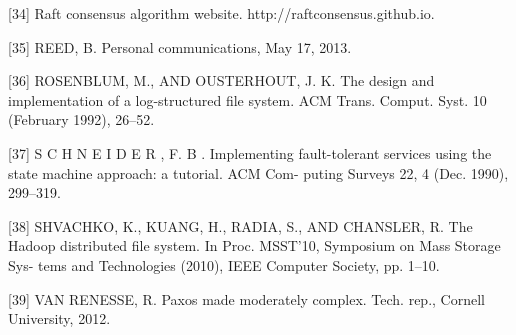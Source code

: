 \documentclass[journal]{IEEEtran}
\begin{document}
[34] Raft consensus algorithm website. http://raftconsensus.github.io.

[35] REED, B. Personal communications, May 17, 2013.

[36] ROSENBLUM, M., AND OUSTERHOUT, J. K. The design and implementation of a log-structured file system. ACM Trans. Comput. Syst. 10 (February 1992), 26–52.

[37] S C H N E I D E R , F. B . Implementing fault-tolerant services using the state machine approach: a tutorial. ACM Com- puting Surveys 22, 4 (Dec. 1990), 299–319.

[38] SHVACHKO, K., KUANG, H., RADIA, S., AND CHANSLER, R. The Hadoop distributed file system. In Proc. MSST’10, Symposium on Mass Storage Sys- tems and Technologies (2010), IEEE Computer Society, pp. 1–10.

[39] VAN RENESSE, R. Paxos made moderately complex. Tech. rep., Cornell University, 2012.







\end{document}
